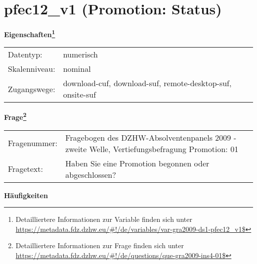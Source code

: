 
    \setcounter{footnote}{0}

    \vspace*{-1.8cm}
	\section{pfec12\_v1 (Promotion: Status)}
	\label{section:pfec12_v1}



    \vspace*{0.5cm}
    \noindent\textbf{Eigenschaften\footnote{Detailliertere Informationen zur Variable finden sich unter
		\url{https://metadata.fdz.dzhw.eu/\#!/de/variables/var-gra2009-ds1-pfec12_v1$}}}\\
	\begin{tabularx}{\hsize}{@{}lX}
	Datentyp: & numerisch \\
	Skalenniveau: & nominal \\
	Zugangswege: &
	  download-cuf, 
	  download-suf, 
	  remote-desktop-suf, 
	  onsite-suf
 \\
    \end{tabularx}



				\vspace*{0.5cm}
                \noindent\textbf{Frage\footnote{Detailliertere Informationen zur Frage finden sich unter
		              \url{https://metadata.fdz.dzhw.eu/\#!/de/questions/que-gra2009-ins4-01$}}}\\
				\begin{tabularx}{\hsize}{@{}lX}
					Fragenummer: &
					  Fragebogen des DZHW-Absolventenpanels 2009 - zweite Welle, Vertiefungsbefragung Promotion:
					  01
 \\
					Fragetext: & Haben Sie eine Promotion begonnen oder abgeschlossen? \\
				\end{tabularx}





        		\vspace*{0.5cm}
                \noindent\textbf{Häufigkeiten}

